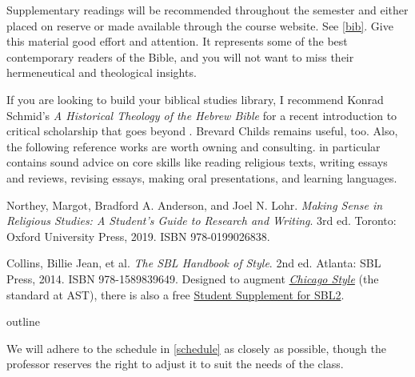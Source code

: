 \documentclass[titlepage]{article}
\begin{document}
Supplementary readings will be recommended throughout the semester and
either placed on reserve or made available through the course website.
See \autoref{bib}. Give this material good effort and attention. It
represents some of the best contemporary readers of the Bible, and you
will not want to miss their hermeneutical and theological insights.

If you are looking to build your biblical studies library, I recommend
Konrad Schmid's \emph{A Historical Theology of the Hebrew Bible}
\cite{ks19} for a recent introduction to critical scholarship that goes
beyond \cite{hbfb}. Brevard Childs \cite{bc79, bc92} remains useful,
too. Also, the following reference works are worth owning and
consulting. \cite{rlgs} in particular contains sound advice on core
skills like reading religious texts, writing essays and reviews,
revising essays, making oral presentations, and learning languages.

\begingroup
\renewcommand{\section}[2]{}%
\begin{thebibliography}{Making Sense}%

	 Northey, Margot, Bradford A. Anderson, and Joel N. Lohr.
	\emph{Making Sense in Religious Studies: A Student's Guide to Research and Writing}.
	3rd ed. Toronto: Oxford University Press, 2019. ISBN 978-0199026838.

	 Collins, Billie Jean, et al.
	\emph{The SBL Handbook of Style}.
	2nd ed. Atlanta: SBL Press, 2014. ISBN 978-1589839649.
	Designed to augment \href{http://www.chicagomanualofstyle.org/home.html}{\emph{Chicago Style}}
	(the standard at AST), there is also a free
	\href{https://www.sbl-site.org/assets/pdfs/pubs/SBLHSsupp2015-02.pdf}{Student Supplement for SBL2}.

\end{thebibliography}
\endgroup


\section{Course Outline}
\label{outline}

We will adhere to the schedule in \autoref{schedule} as closely as
possible, though the professor reserves the right to adjust it to suit
the needs of the class.
\end{document}
